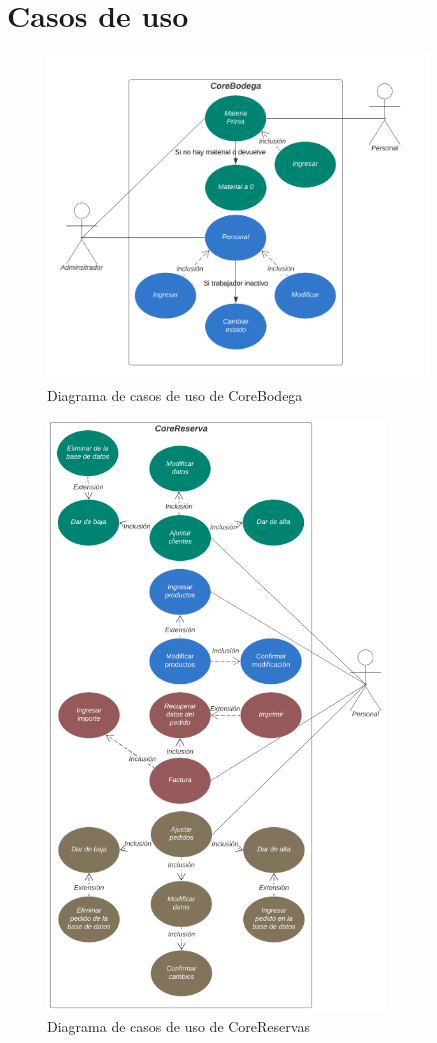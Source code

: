 \chapter{Casos de uso}

\begin{figure}[h]
    \centering
    \includegraphics[width=0.9\textwidth]{figures/casos-de-uso-core-bodega.png}
    \caption{Diagrama de casos de uso de CoreBodega}
    \label{fig:corebodega}
\end{figure}

\begin{figure}[h]
    \centering
    \includegraphics[width=0.8\textwidth]{figures/casos-de-uso-core-reservas.png}
    \caption{Diagrama de casos de uso de CoreReservas}
    \label{fig:corereservas}
\end{figure}
